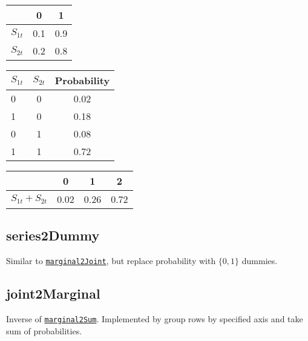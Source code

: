 \documentclass[12pt]{article}
\let\code=\texttt
\begin{document}
\vspace{10mm}
\begin{minipage}[t]{.3\textwidth}
    \begin{tabular}{lcc}
        \hline
            & 0 & 1\\\hline
        $S_{1t}$ & 0.1 & 0.9   \\
        $S_{2t}$ & 0.2 & 0.8   \\\hline
    \end{tabular}
\end{minipage}%
\begin{minipage}[t]{0.4\textwidth}
    \begin{tabular}{lcc}
        \hline
        $S_{1t}$ & $S_{2t}$ &  Probability\\\hline
         0 & 0 &  0.02\\
         1 & 0 &  0.18 \\
         0 & 1 &  0.08 \\
         1 & 1 &  0.72 \\\hline
    \end{tabular}
\end{minipage}%
\begin{minipage}[t]{.3\textwidth}
    \begin{tabular}{lccc}
        \hline
            & 0 & 1 & 2\\\hline
        $S_{1t}+S_{2t}$ & 0.02 & 0.26 & 0.72   \\\hline
    \end{tabular}
\end{minipage}%


\subsection{series2Dummy}
\label{series2Dummy}

Similar to \hyperref[marginal2Joint]{\code{marginal2Joint}}, but replace probability with $\{0, 1\}$ dummies.


\subsection{joint2Marginal}
\label{joint2Marginal}

Inverse of \hyperref[marginal2Sum]{\code{marginal2Sum}}. Implemented by group rows by specified axis and take sum of probabilities.
\end{document}
